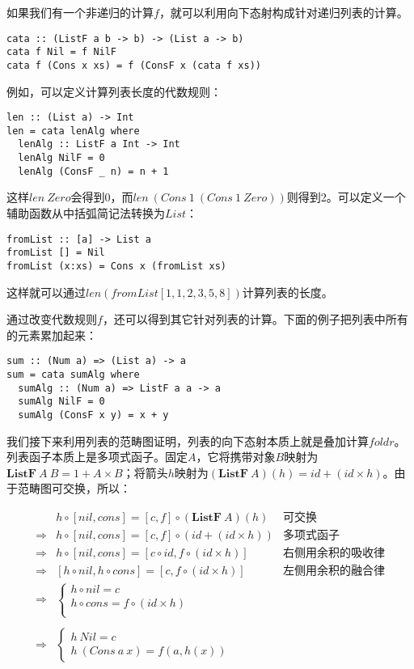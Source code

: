 \documentclass{article}
\begin{document}
\begin{example}
如果我们有一个非递归的计算$f$，就可以利用向下态射构成针对递归列表的计算。

\lstset{frame=single}
\begin{lstlisting}[style=Haskell]
cata :: (ListF a b -> b) -> (List a -> b)
cata f Nil = f NilF
cata f (Cons x xs) = f (ConsF x (cata f xs))
\end{lstlisting}

例如，可以定义计算列表长度的代数规则：

\begin{lstlisting}[style=Haskell]
len :: (List a) -> Int
len = cata lenAlg where
  lenAlg :: ListF a Int -> Int
  lenAlg NilF = 0
  lenAlg (ConsF _ n) = n + 1
\end{lstlisting}

这样$len\ Zero$会得到0，而$len\ (Cons\ 1\ (Cons\ 1\ Zero))$则得到2。可以定义一个辅助函数从中括弧简记法转换为$List$：

\begin{lstlisting}
fromList :: [a] -> List a
fromList [] = Nil
fromList (x:xs) = Cons x (fromList xs)
\end{lstlisting}

这样就可以通过$len (fromList [1, 1, 2, 3, 5, 8])$计算列表的长度。

通过改变代数规则$f$，还可以得到其它针对列表的计算。下面的例子把列表中所有的元素累加起来：

\begin{lstlisting}
sum :: (Num a) => (List a) -> a
sum = cata sumAlg where
  sumAlg :: (Num a) => ListF a a -> a
  sumAlg NilF = 0
  sumAlg (ConsF x y) = x + y
\end{lstlisting}

我们接下来利用列表的范畴图证明，列表的向下态射本质上就是叠加计算$foldr$。
列表函子本质上是多项式函子。固定$A$，它将携带对象$B$映射为$\mathbf{ListF}\ A\ B = 1 + A \times B$；将箭头$h$映射为$(\mathbf{ListF}\ A)(h) = id + (id \times h)$。由于范畴图可交换，所以：

\[
\begin{array}{rll}
            & h \circ [nil, cons] = [c, f] \circ (\mathbf{ListF}\ A)(h) & \text{可交换} \\
\Rightarrow & h \circ [nil, cons] = [c, f] \circ (id + (id \times h)) & \text{多项式函子} \\
\Rightarrow & h \circ [nil, cons] = [c \circ id, f \circ (id \times h)] & \text{右侧用余积的吸收律} \\
\Rightarrow & [h \circ nil, h \circ cons] = [c, f \circ (id \times h)] & \text{左侧用余积的融合律} \\
\Rightarrow &
  \begin{cases}
    h \circ nil = c \\
    h \circ cons = f \circ (id \times h) \\
  \end{cases} & \\
\\
\Rightarrow &
  \begin{cases}
    h\ Nil = c \\
    h\ (Cons\ a\ x) = f(a, h(x))
  \end{cases} & \\
\end{array}
\]


\end{example}
\end{document}

